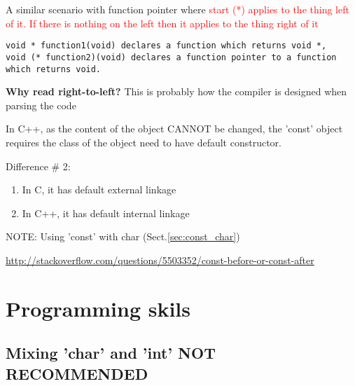 A similar scenario with function pointer where \textcolor{red}{start (*) applies
to the thing left of it. If there is nothing on the left then it applies to the
thing right of it}
\begin{verbatim}
void * function1(void) declares a function which returns void *,
void (* function2)(void) declares a function pointer to a function which returns void.
\end{verbatim}

\begin{framed}
{\bf Why read right-to-left?} This is probably how the compiler is designed when
parsing the code
\end{framed}

In C++, as the content of the object CANNOT be changed,  the 'const' object
requires the class of the object need to have default constructor.

Difference \# 2:
\begin{enumerate}
  \item In C, it has default external linkage
  \item In C++, it has default internal linkage
\end{enumerate}

NOTE: Using 'const' with char (Sect.\ref{sec:const_char})


\url{http://stackoverflow.com/questions/5503352/const-before-or-const-after}

\section{Programming skils}

\subsection{Mixing 'char' and 'int' NOT RECOMMENDED}

